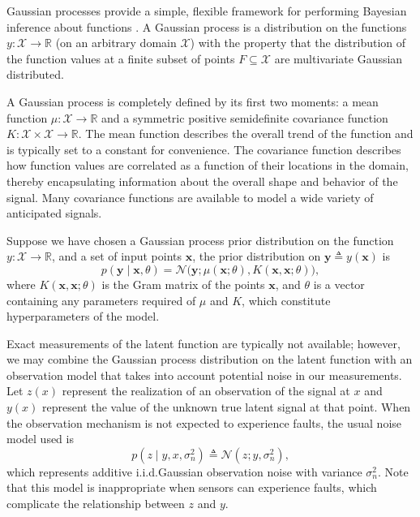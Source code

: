 \documentclass{article}
\newcommand{\R}{\ensuremath{\mathbb{R}}}
\newcommand{\deq}{\ensuremath{\triangleq}}
\newcommand{\given}{\ensuremath{\mid}}
\newcommand{\cm}[1]{\ensuremath{\mathcal{#1}}}
\newcommand{\bm}[1]{\ensuremath{\mathbf{#1}}}
\begin{document}
Gaussian processes provide a simple, flexible framework for performing
Bayesian inference about functions \citep{gpml}.  A Gaussian process
is a distribution on the functions $y\colon \cm{X} \to \R$ (on an
arbitrary domain $\cm{X}$) with the property that the distribution of
the function values at a finite subset of points $F \subseteq \cm{X}$
are multivariate Gaussian distributed.

A Gaussian process is completely defined by its first two moments: a
mean function $\mu\colon \cm{X} \to \R$ and a symmetric positive
semidefinite covariance function $K\colon \cm{X} \times \cm{X} \to
\R$.  The mean function describes the overall trend of the function
and is typically set to a constant for convenience.  The covariance
function describes how function values are correlated as a function of
their locations in the domain, thereby encapsulating information about
the overall shape and behavior of the signal.  Many covariance
functions are available to model a wide variety of anticipated
signals.

Suppose we have chosen a Gaussian process prior distribution on the
function $y\colon \cm{X} \to \R$, and a set of input points $\bm{x}$,
the prior distribution on $\bm{y} \deq y(\bm{x})$ is
\begin{equation*}
 p(\bm{y} \given \bm{x}, \theta)
 =
 \cm{N}
 \bigl(
   \bm{y};
   \mu(\bm{x}; \theta),
   K(\bm{x}, \bm{x}; \theta)
 \bigr),
\end{equation*}
where $K(\bm{x}, \bm{x}; \theta)$ is the Gram matrix of the points
$\bm{x}$, and $\theta$ is a vector containing any parameters required
of $\mu$ and $K$, which constitute hyperparameters of the model.

Exact measurements of the latent function are typically not available;
however, we may combine the Gaussian process distribution on the
latent function with an observation model that takes into account
potential noise in our measurements.  Let $z(x)$ represent the
realization of an observation of the signal at $x$ and $y(x)$
represent the value of the unknown true latent signal at that point.
When the observation mechanism is not expected to experience faults,
the usual noise model used is
\begin{equation}\label{iidnoise}
 p(z \given y, x, \sigma_n^2)
 \deq
 \cm{N}(z; y, \sigma_n^2),
\end{equation}
which represents additive i.i.d.\space Gaussian observation noise with
variance $\sigma_n^2$. Note that this model is inappropriate when
sensors can experience faults, which complicate the relationship
between $z$ and $y$.
\end{document}
